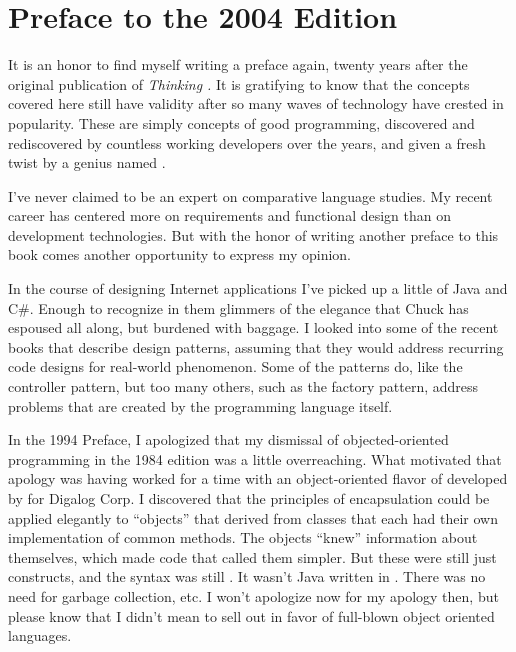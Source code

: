 \chapter*{Preface to the 2004 Edition}
\pagestyle{headings}

\initial It is an honor to find myself writing a preface again, twenty years
after the original publication of \emph{Thinking \Forth{}.} It is gratifying to
know that the concepts covered here still have validity after so many
waves of technology have crested in popularity. These are simply
concepts of good programming, discovered and rediscovered by countless
working developers over the years, and given a fresh twist by a genius
named .

I've never claimed to be an expert on comparative language studies. My
recent career has centered more on requirements and functional design
than on development technologies. But with the honor of writing
another preface to this book comes another opportunity to express my
opinion.

In the course of designing Internet applications I've picked up a
little of Java and C\#. Enough to recognize in them glimmers of the
elegance that Chuck has espoused all along, but burdened with
baggage. I looked into some of the recent books that describe design
patterns, assuming that they would address recurring code designs for
real-world phenomenon. Some of the patterns do, like the controller
pattern, but too many others, such as the factory pattern, address
problems that are created by the programming language itself.

In the 1994 Preface, I apologized that my dismissal of
objected-oriented programming in the 1984 edition was a little
overreaching. What motivated that apology was having worked for a time
with an object-oriented flavor of \Forth{} developed by  for Digalog Corp. I discovered that the principles of
encapsulation could be applied elegantly to \Forth{} ``objects'' that
derived from classes that each had their own implementation of common
methods. The objects ``knew'' information about themselves, which made
code that called them simpler. But these were still just \Forth{}
constructs, and the syntax was still \Forth{}. It wasn't Java written
in \Forth{}. There was no need for garbage collection, etc. I won't
apologize now for my apology then, but please know that I didn't mean
to sell out in favor of full-blown object oriented languages.

